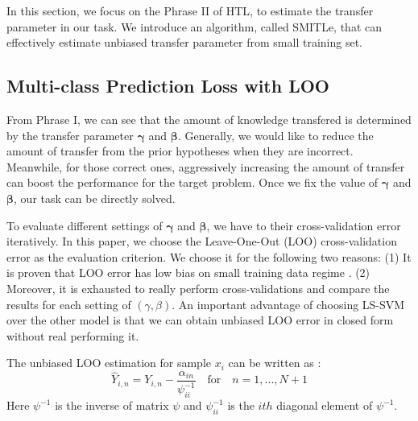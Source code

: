 In this section, we focus on the Phrase II of HTL, to estimate the transfer parameter in our task. We introduce an algorithm, called SMITLe, that can effectively estimate unbiased transfer parameter from small training set. %

\subsection{Multi-class Prediction Loss with LOO}

From Phrase I, we can see that the amount of knowledge transfered is determined by the transfer parameter $\boldsymbol{\gamma}$ and $\boldsymbol{\beta}$. Generally, we would like to reduce the amount of transfer from the prior hypotheses when they are incorrect. Meanwhile, for those correct ones, aggressively increasing the amount of transfer can boost the performance for the target problem. Once we fix the value of $\boldsymbol{\gamma}$ and $\boldsymbol{\beta}$, our task can be directly solved.

To evaluate different settings of $\boldsymbol{\gamma}$ and $\boldsymbol{\beta}$, we have to their cross-validation error iteratively. In this paper, we choose the Leave-One-Out (LOO) cross-validation error as the evaluation criterion. We choose it for the following two reasons: (1) It is proven that LOO error has low bias on small training data regime \cite{kuzborskij2013stability}. (2) Moreover, it is exhausted to really perform cross-validations and compare the results for each setting of $(\gamma,\beta)$. An important advantage of choosing LS-SVM over the other model is that we can obtain unbiased LOO error in closed form without real performing it. 

The unbiased LOO estimation for sample $x_i$ can be written as \cite{cawley2006leave}:
\begin{equation}
{\hat Y_{i,n}} = {Y_{i,n}} - \frac{{{\alpha _{in}}}}{{\psi_{ii}^{ - 1}}}\quad {\text{for}}\quad n = 1,...,N + 1
\end{equation}
Here $\psi^{-1}$ is the inverse of matrix $\psi$ and  $\psi_{ii}^{-1}$ is the $ith$ diagonal element of $\psi^{-1}$. 

